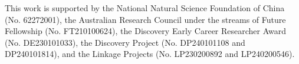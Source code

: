 \documentclass[sigconf]{acmart}
\begin{document}
\begin{acks}
This work is supported by the National Natural Science Foundation of China (No. 62272001), the Australian Research Council under the streams of Future Fellowship (No. FT210100624), the Discovery Early Career Researcher Award (No. DE230101033), the Discovery Project (No. DP240101108 and DP240101814), and the Linkage Projects (No. LP230200892 and LP240200546). 
\end{acks}





\end{document}
